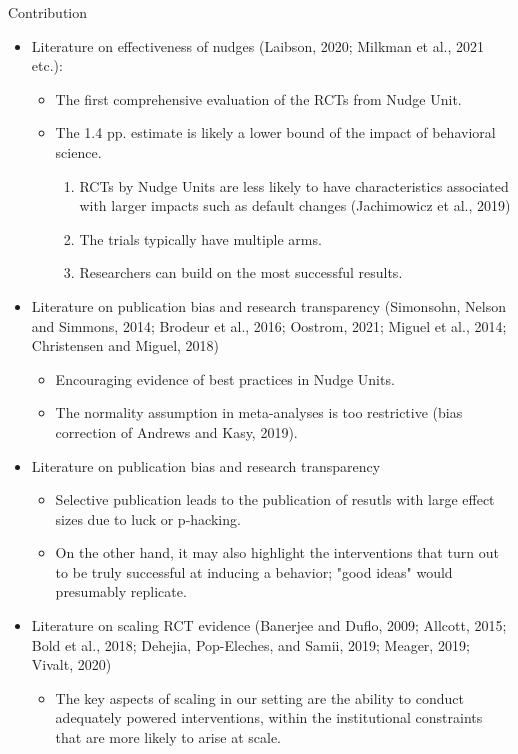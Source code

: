 \documentclass[dvipdfmx,11pt]{beamer}
\begin{document}
\begin{frame}{Contribution}
  \begin{itemize}
    \item Literature on effectiveness of nudges (Laibson, 2020; Milkman et al., 2021 etc.):
    \begin{itemize}
      \item The first comprehensive evaluation of the RCTs from Nudge Unit. 
      \item The 1.4 pp. estimate is likely a lower bound of the impact of behavioral science.
      \begin{enumerate}
        \item RCTs by Nudge Units are less likely to have characteristics associated with larger impacts such as default changes (Jachimowicz et al., 2019)
        \item The trials typically have multiple arms. 
        \item Researchers can build on the most successful results.
      \end{enumerate}
    \end{itemize}
    \item Literature on publication bias and research transparency (Simonsohn, Nelson and Simmons, 2014; Brodeur et al., 2016; Oostrom, 2021; Miguel et al., 2014; Christensen and Miguel, 2018)
    \begin{itemize}
      \item Encouraging evidence of best practices in Nudge Units.
      \item The normality assumption in meta-analyses is too restrictive (bias correction of Andrews and Kasy, 2019).
    \end{itemize}
  \end{itemize}
\end{frame}

\begin{frame}{}
  \begin{itemize}
    \item Literature on publication bias and research transparency
    \begin{itemize}
      \item Selective publication leads to the publication of resutls with large effect sizes due to luck or p-hacking.
      \item On the other hand, it may also highlight the interventions that turn out to be truly successful at inducing a behavior; "good ideas" would presumably replicate.
    \end{itemize}
    \item Literature on scaling RCT evidence (Banerjee and
    Duflo, 2009; Allcott, 2015; Bold et al., 2018; Dehejia, Pop-Eleches, and Samii, 2019; Meager, 2019; Vivalt, 2020)
    \begin{itemize}
      \item The key aspects of scaling in our setting are the ability to conduct adequately powered interventions, within the institutional constraints that are more likely to arise at scale.
    \end{itemize}
  \end{itemize}
\end{frame}
\end{document}
